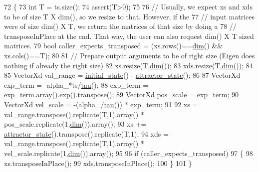 \begin{DoxyCode}
72 \{
73   \textcolor{keywordtype}{int} T = ts.size();
74   assert(T>0);
75 
76   \textcolor{comment}{// Usually, we expect xs and xds to be of size T X dim(), so we resize to that. However, if the}
77   \textcolor{comment}{// input matrices were of size dim() X T, we return the matrices of that size by doing a }
78   \textcolor{comment}{// transposeInPlace at the end. That way, the user can also request dim() X T sized matrices.}
79   \textcolor{keywordtype}{bool} caller\_expects\_transposed = (xs.rows()==\hyperlink{group__DynamicalSystems_ga6f628f7f4ed9d77bf69f5b8560b98f18}{dim}() && xs.cols()==T);
80 
81   \textcolor{comment}{// Prepare output arguments to be of right size (Eigen does nothing if already the right size)}
82   xs.resize(T,\hyperlink{group__DynamicalSystems_ga6f628f7f4ed9d77bf69f5b8560b98f18}{dim}());
83   xds.resize(T,\hyperlink{group__DynamicalSystems_ga6f628f7f4ed9d77bf69f5b8560b98f18}{dim}());
84   
85   VectorXd val\_range = \hyperlink{group__DynamicalSystems_ga4c7f24e7deec1629548a075015bdc693}{initial\_state}() - \hyperlink{group__DynamicalSystems_gaebe3c462bc4a725cb17bcc3d13285f13}{attractor\_state}();
86   
87   VectorXd exp\_term  = -alpha\_*ts/\hyperlink{group__DynamicalSystems_ga50eec7ad4c9664b5809ace45b22200d5}{tau}();
88   exp\_term = exp\_term.array().exp().transpose();
89   VectorXd pos\_scale =                   exp\_term;
90   VectorXd vel\_scale = -(alpha\_/\hyperlink{group__DynamicalSystems_ga50eec7ad4c9664b5809ace45b22200d5}{tau}()) * exp\_term;
91   
92   xs = val\_range.transpose().replicate(T,1).array() * pos\_scale.replicate(1,\hyperlink{group__DynamicalSystems_ga6f628f7f4ed9d77bf69f5b8560b98f18}{dim}()).array();
93   xs += \hyperlink{group__DynamicalSystems_gaebe3c462bc4a725cb17bcc3d13285f13}{attractor\_state}().transpose().replicate(T,1);
94   xds = val\_range.transpose().replicate(T,1).array() * vel\_scale.replicate(1,\hyperlink{group__DynamicalSystems_ga6f628f7f4ed9d77bf69f5b8560b98f18}{dim}()).array();
95   
96   \textcolor{keywordflow}{if} (caller\_expects\_transposed)
97   \{
98     xs.transposeInPlace();
99     xds.transposeInPlace();
100   \}
101 \}
\end{DoxyCode}


